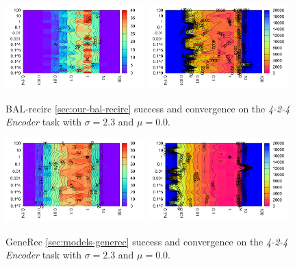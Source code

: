 \begin{figure}[H]
  \centering
  \includegraphics[width=0.48\textwidth]{img/bal-recirc-auto4-success.pdf}   
  \includegraphics[width=0.48\textwidth]{img/bal-recirc-auto4-epoch.pdf}     
  \caption{BAL-recirc \ref{sec:our-bal-recirc} success and convergence on the \emph{4-2-4 Encoder} task with $\sigma = 2.3$ and $\mu = 0.0$.}
  \label{fig:results-bal-recirc-auto4-performance}
\end{figure}


\begin{figure}[H]
  \centering
  \includegraphics[width=0.48\textwidth]{img/generec-auto4-success.pdf}   
  \includegraphics[width=0.48\textwidth]{img/generec-auto4-epoch.pdf}     
  \caption{GeneRec \ref{sec:models-generec} success and convergence on the \emph{4-2-4 Encoder} task with $\sigma = 2.3$ and $\mu = 0.0$.}
  \label{fig:results-generec-auto4-performance}
\end{figure}


